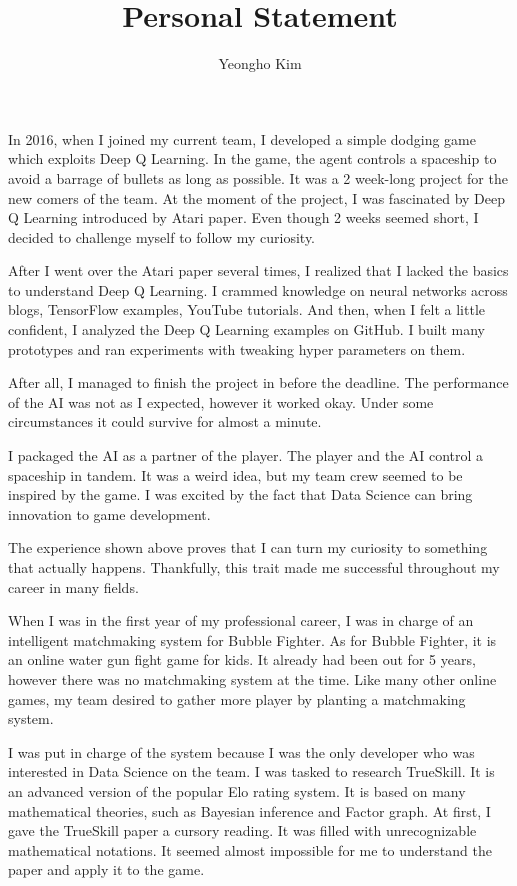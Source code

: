 \documentclass[11pt]{article}
\author{Yeongho Kim}
\date{}
\title{Personal Statement}
\begin{document}
\maketitle
\vspace{-4ex}

In 2016, when I joined my current team, I developed a simple dodging game which exploits Deep Q Learning.
In the game, the agent controls a spaceship to avoid a barrage of bullets as long as possible.
It was a 2 week-long project for the new comers of the team.
At the moment of the project, I was fascinated by Deep Q Learning introduced by Atari paper.
Even though 2 weeks seemed short, I decided to challenge myself to follow my curiosity.

After I went over the Atari paper several times, I realized that I lacked the basics to understand Deep Q Learning.
I crammed knowledge on neural networks across blogs, TensorFlow examples, YouTube tutorials.
And then, when I felt a little confident, I analyzed the Deep Q Learning examples on GitHub.
I built many prototypes and ran experiments with tweaking hyper parameters on them.

After all, I managed to finish the project in before the deadline.
The performance of the AI was not as I expected, however it worked okay.
Under some circumstances it could survive for almost a minute.

I packaged the AI as a partner of the player.
The player and the AI control a spaceship in tandem.
It was a weird idea, but my team crew seemed to be inspired by the game.
I was excited by the fact that Data Science can bring innovation to game development.

The experience shown above proves that I can turn my curiosity to something that actually happens.
Thankfully, this trait made me successful throughout my career in many fields. 

When I was in the first year of my professional career, I was in charge of an intelligent matchmaking system for Bubble Fighter.
As for Bubble Fighter, it is an online water gun fight game for kids.
It already had been out for 5 years, however there was no matchmaking system at the time.
Like many other online games, my team desired to gather more player by planting a matchmaking system.

I was put in charge of the system because I was the only developer who was interested in Data Science on the team.
I was tasked to research TrueSkill.
It is an advanced version of the popular Elo rating system.
It is based on many mathematical theories, such as Bayesian inference and Factor graph.
At first, I gave the TrueSkill paper a cursory reading.
It was filled with unrecognizable mathematical notations.
It seemed almost impossible for me to understand the paper and apply it to the game.
\end{document}
